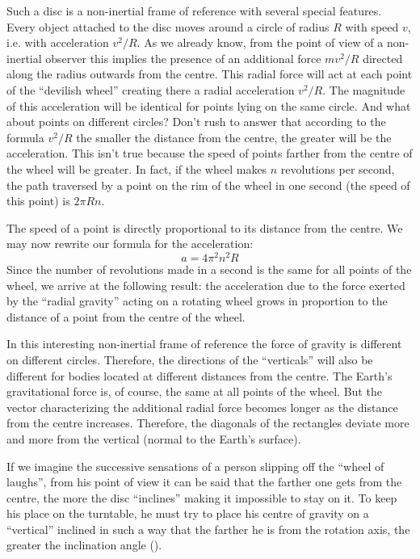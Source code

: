 Such a disc is a non-inertial frame of reference with
several special features. Every object attached to the
disc moves around a circle of radius $R$ with speed $v$,
i.e. with acceleration $v^{2}/R$. As we already know, from
the point of view of a non-inertial observer this implies
the presence of an additional force $mv^{2}/R$ directed along
the radius outwards from the centre. This radial force
will act at each point of the ``devilish wheel'' creating
there a radial acceleration $v^{2}/R$. The magnitude of this
acceleration will be identical for points lying on the same
circle. And what about points on different circles? Don't
rush to answer that according to the formula $v^{2}/R$ the
smaller the distance from the centre, the greater will be
the acceleration. This isn't true because the speed of
points farther from the centre of the wheel will be greater.
In fact, if the wheel makes $n$ revolutions per second,
the path traversed by a point on the rim of the wheel
in one second (the speed of this point) is $2\pi R n$.

The speed of a point is directly proportional to its
distance from the centre. We may now rewrite our formula for the acceleration:
\begin{equation*}
a = 4 \pi^{2} n^{2} R
\end{equation*}
Since the number of revolutions made in a second is the
same for all points of the wheel, we arrive at the following result: the acceleration due to the force exerted by
the ``radial gravity'' acting on a rotating wheel grows in
proportion to the distance of a point from the centre
of the wheel.

In this interesting non-inertial frame of reference the
force of gravity is different on different circles. Therefore,
the directions of the ``verticals'' will also be different for
bodies located at different distances from the centre.
The Earth's gravitational force is, of course, the same
at all points of the wheel. But the vector characterizing
the additional radial force becomes longer as the distance
from the centre increases. Therefore, the diagonals of
the rectangles deviate more and more from the vertical
(normal to the Earth's surface).

If we imagine the successive sensations of a person
slipping off the ``wheel of laughs'', from his point of view
it can be said that the farther one gets from the centre,
the more the disc ``inclines'' making it impossible to stay
on it. To keep his place on the turntable, he must try
to place his centre of gravity on a ``vertical'' inclined in
such a way that the farther he is from the rotation axis,
the greater the inclination angle ().

